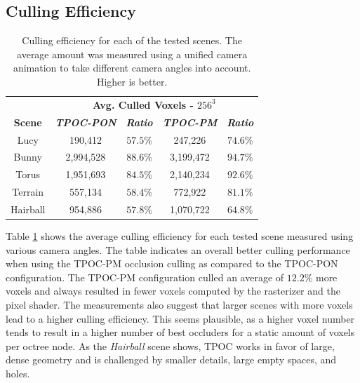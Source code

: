 \documentclass[conference]{IEEEtran}
\begin{document}
\subsection{Culling Efficiency} \label{subsec-culling-efficiency}

\begin{table}[htbp]
    \caption{Culling efficiency for each of the tested scenes. The average amount was measured using a 
    unified camera animation to take different camera angles into account. Higher is better.}
    \begin{center}
        \begin{tabular}{|c|cc|cc|}
            \hline
            \textbf{}&\multicolumn{4}{|c|}{\textbf{Avg. Culled Voxels - $256^3$}} \\
            \cline{2-5} 
            \textbf{Scene} & \textbf{\textit{\ac{TPOC-PON}}} & \textbf{\textit{Ratio}} & \textbf{\textit{\ac{TPOC-PM}}} & \textbf{\textit{Ratio}} \\
            \hline
            Lucy        &  190,412      & $57.5 \%$    & 247,226        & $74.6 \%$     \\
            Bunny       &  2,994,528    & $88.6 \%$    & 3,199,472      & $94.7 \%$     \\
            Torus       &  1,951,693    & $84.5 \%$    & 2,140,234      & $92.6 \%$     \\
            Terrain     &  557,134      & $58.4 \%$    & 772,922        & $81.1 \%$     \\
            Hairball    &  954,886      & $57.8 \%$    & 1,070,722      & $64.8 \%$     \\
            \hline
        \end{tabular}
    \label{tab:culling-efficiency}
    \end{center}
\end{table}

\noindent
Table \ref{tab:culling-efficiency} shows the average culling efficiency for each tested scene measured using 
various camera angles. The table indicates an overall better culling performance when using the \ac{TPOC-PM} 
occlusion culling as compared to the \ac{TPOC-PON} configuration. The \ac{TPOC-PM} configuration culled 
an average of $12.2 \%$ more voxels and always resulted in fewer voxels computed by the rasterizer and the 
pixel shader. The measurements also suggest that larger scenes with more voxels lead to a higher culling 
efficiency. This seems plausible, as a higher voxel number tends to result in a higher number of best occluders 
for a static amount of voxels per octree node. As the \emph{Hairball} scene shows, \ac{TPOC} works in favor 
of large, dense geometry and is challenged by smaller details, large empty spaces, and holes.
\end{document}
